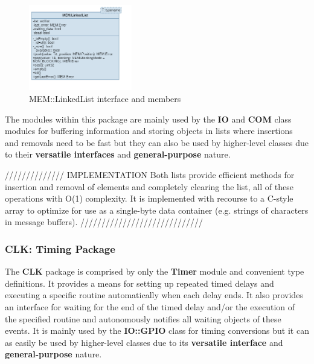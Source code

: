 \begin{figure}[H]
	\centering
	\includegraphics[width=0.4\textwidth]{./img/navig-class-linkedlist.png}
	\caption {MEM::LinkedList interface and members}
	\label{fig:navig-class-linkedlist}
	\end{figure}


The modules within this package are mainly used by the \textbf{IO} and \textbf{COM} class modules for buffering information and storing objects in lists where insertions and removals need to be fast but they can also be used by higher-level classes due to their \textbf{versatile interfaces} and \textbf{general-purpose} nature.

////////////// IMPLEMENTATION
Both lists provide efficient methods for insertion and removal of elements and completely clearing the list, all of these operations with O(1) complexity.
It is implemented with recourse to a C-style array to optimize for use as a single-byte data container (e.g. strings of characters in message buffers).
/////////////////////////////




\subsubsection{CLK: Timing Package}

The \textbf{CLK} package is comprised by only the \textbf{Timer} module and convenient type definitions. It provides a means for setting up repeated timed delays and executing a specific routine automatically when each delay ends. It also provides an interface for waiting for the end of the timed delay and/or the execution of the specified routine and autonomously notifies all waiting objects of these events.
It is mainly used by the \textbf{IO::GPIO} class for timing conversions but it can as easily be used by higher-level classes due to its \textbf{versatile interface} and \textbf{general-purpose} nature.


